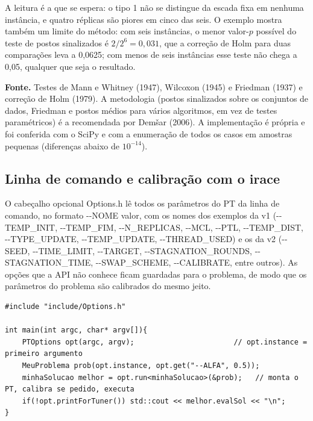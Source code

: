 \documentclass[10pt,a4paper]{article}
\newcommand{\code}[1]{{\ttfamily #1}}
\begin{document}
A leitura é a que se espera: o tipo 1 não se distingue da escada fixa em nenhuma instância, e quatro réplicas são piores em cinco das seis. O exemplo mostra também um limite do método: com seis instâncias, o menor valor-$p$ possível do teste de postos sinalizados é $2/2^6 = 0{,}031$, que a correção de Holm para duas comparações leva a 0,0625; com menos de seis instâncias esse teste não chega a 0,05, qualquer que seja o resultado.

\begin{fonte}
\textbf{Fonte.} Testes de Mann e Whitney (1947), Wilcoxon (1945) e Friedman (1937) e correção de Holm (1979). A metodologia (postos sinalizados sobre os conjuntos de dados, Friedman e postos médios para vários algoritmos, em vez de testes paramétricos) é a recomendada por Demšar (2006). A implementação é própria e foi conferida com o SciPy e com a enumeração de todos os casos em amostras pequenas (diferenças abaixo de $10^{-14}$).
\end{fonte}

\subsection{Linha de comando e calibração com o irace}

O cabeçalho opcional \code{Options.h} lê todos os parâmetros do PT da linha de comando, no formato \code{-{}-NOME valor}, com os nomes dos exemplos da v1 (\code{-{}-TEMP\_INIT}, \code{-{}-TEMP\_FIM}, \code{-{}-N\_REPLICAS}, \code{-{}-MCL}, \code{-{}-PTL}, \code{-{}-TEMP\_DIST}, \code{-{}-TYPE\_UPDATE}, \code{-{}-TEMP\_UPDATE}, \code{-{}-THREAD\_USED}) e os da v2 (\code{-{}-SEED}, \code{-{}-TIME\_LIMIT}, \code{-{}-TARGET}, \code{-{}-STAGNATION\_ROUNDS}, \code{-{}-STAGNATION\_TIME}, \code{-{}-SWAP\_SCHEME}, \code{-{}-CALIBRATE}, entre outros). As opções que a API não conhece ficam guardadas para o problema, de modo que os parâmetros do problema são calibrados do mesmo jeito.

\begin{lstlisting}[style=cpp]
#include "include/Options.h"

int main(int argc, char* argv[]){
    PTOptions opt(argc, argv);                       // opt.instance = primeiro argumento
    MeuProblema prob(opt.instance, opt.get("--ALFA", 0.5));
    minhaSolucao melhor = opt.run<minhaSolucao>(&prob);   // monta o PT, calibra se pedido, executa
    if(!opt.printForTuner()) std::cout << melhor.evalSol << "\n";
}
\end{lstlisting}
\end{document}
